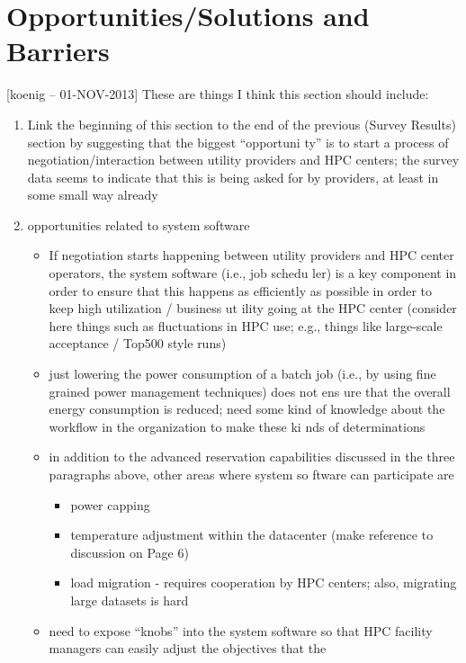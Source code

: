 \documentclass{llncs}
\begin{document}
\section{Opportunities/Solutions and Barriers} 

[koenig -- 01-NOV-2013] These are things I think this section should
include:

\begin{enumerate}
\item Link the beginning of this section to the end of the previous (Survey Results) section by suggesting that the biggest ``opportuni
ty'' is to start a process of negotiation/interaction between utility providers and HPC centers; the survey data seems to indicate that
 this is being asked for by providers, at least in some small way already
\item opportunities related to system software
        \begin{itemize}
        \item If negotiation starts happening between utility providers and HPC center operators, the system software (i.e., job schedu
ler) is a key component in order to ensure that this happens as efficiently as possible in order to keep high utilization / business ut
ility going at the HPC center (consider here things such as fluctuations in HPC use; e.g., things like large-scale acceptance / Top500
style runs)
        \item just lowering the power consumption of a batch job (i.e., by using fine grained power management techniques) does not ens
ure that the overall energy consumption is reduced; need some kind of knowledge about the workflow in the organization to make these ki
nds of determinations
        \item in addition to the advanced reservation capabilities discussed in the three paragraphs above, other areas where system so
ftware can participate are
                \begin{itemize}
                \item power capping
                \item temperature adjustment within the datacenter (make reference to discussion on Page 6)
                \item load migration - requires cooperation by HPC centers; also, migrating large datasets is hard
                \end{itemize}
        \item need to expose ``knobs'' into the system software so that HPC facility managers can easily adjust the objectives that the

\end{itemize}
\end{enumerate}
\end{document}
